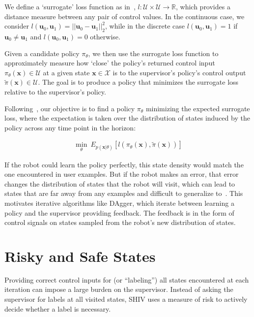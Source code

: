\documentclass[10pt, conference]{ieeeconf}      %
\newcommand{\bu}{\mathbf{u}}
\newcommand{\bx}{\mathbf{x}}
\begin{document}
We define a `surrogate' loss function as in~\cite{ross2010reduction}, $l:\mathcal{U}\times \mathcal{U}\to \mathbb{R}$, which provides a distance
measure between any pair of control values. In the continuous case, we consider $l(\bu_0,\bu_1) = ||\bu_0-\bu_1||^2_2$,
while in the discrete case $l(\bu_0,\bu_1) = 1$ if $\bu_0 \neq \bu_1$ and $l(\bu_0, \bu_1)=0$ otherwise.

Given a candidate policy $\pi_{\theta}$, we then use the surrogate loss function to approximately measure how `close' the policy's
returned control input $\pi_{\theta}(\bx)\in \mathcal{U}$ at a given state $\bx\in \mathcal{X}$ is to the supervisor's policy's control output
$\tilde{\pi}(\bx)\in \mathcal{U}$. The goal is to produce a policy that minimizes the surrogate loss relative to the supervisor's policy.


Following~\cite{ross2010reduction}, our objective is to find a policy $\pi_{\theta}$ minimizing the expected surrogate loss, where the expectation is taken over the distribution of states induced by the policy across any time point in the horizon:

 \vspace{-2ex}
\begin{align}\label{eq:LFD_obj}
\underset{\theta}{\min} \: E_{p(\bx|\theta)} [l(\pi_\theta(\bx),\tilde{\pi}(\bx))]
\end{align}

 If the robot could learn the policy  perfectly, this state density would match the one encountered in user examples. But if the robot makes an error, that error changes the distribution of states that the robot will visit, which can lead to states that are far away from any examples and difficult to generalize to~\cite{pomerleau1989alvinn}. This motivates iterative algorithms like DAgger, which iterate between learning a policy and the supervisor providing feedback. The feedback is in the form of control signals on states sampled from the robot's new distribution of states. 

\section{Risky and Safe States}


Providing correct control inputs for (or ``labeling'')  all states encountered at each
iteration can impose a large burden on the supervisor.
Instead of asking the supervisor for labels at all visited states, SHIV uses a measure of risk to actively decide whether a label is necessary. 
\end{document}
